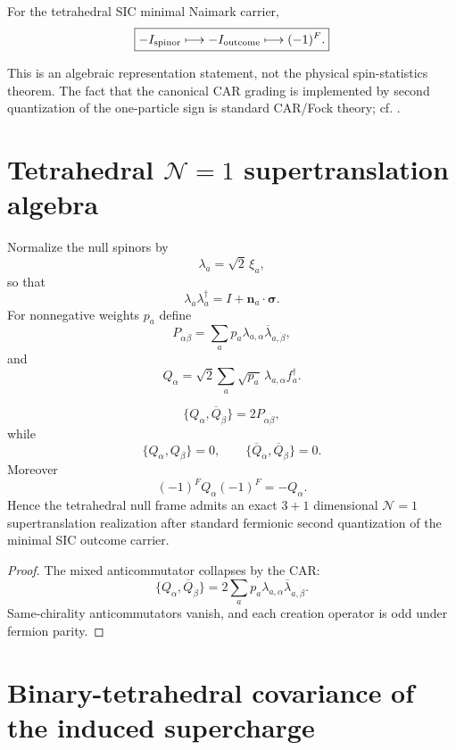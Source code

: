 \begin{theorem}\label{thm:center-parity}
For the tetrahedral SIC minimal Naimark carrier,
\[
\boxed{
-I_{\rm spinor}
\longmapsto
-I_{\rm outcome}
\longmapsto
(-1)^F.
}
\]
\end{theorem}

This is an algebraic representation statement, not the physical spin-statistics theorem. The fact that the canonical CAR grading is implemented by second quantization of the one-particle sign is standard CAR/Fock theory; cf. \cite{BratteliRobinson1997}.

\section{Tetrahedral $\mathcal N=1$ supertranslation algebra}

Normalize the null spinors by
\[
\lambda_a=\sqrt2\,\xi_a,
\]
so that
\[
\lambda_a\lambda_a^\dagger
=
I+\mathbf n_a\cdot\boldsymbol\sigma.
\]
For nonnegative weights $p_a$ define
\[
P_{\alpha\dot\beta}
=
\sum_a
p_a
\lambda_{a,\alpha}
\overline{\lambda}_{a,\dot\beta},
\]
and
\[
Q_\alpha
=
\sqrt2
\sum_a
\sqrt{p_a}\,
\lambda_{a,\alpha}f_a^\dagger.
\]

\begin{theorem}\label{thm:tetra-susy}
\[
\boxed{
\{Q_\alpha,\overline Q_{\dot\beta}\}
=
2P_{\alpha\dot\beta},
}
\]
while
\[
\{Q_\alpha,Q_\beta\}=0,
\qquad
\{\overline Q_{\dot\alpha},\overline Q_{\dot\beta}\}=0.
\]
Moreover
\[
\boxed{
(-1)^FQ_\alpha(-1)^F=-Q_\alpha.
}
\]
Hence the tetrahedral null frame admits an exact $3+1$ dimensional $\mathcal N=1$ supertranslation realization after standard fermionic second quantization of the minimal SIC outcome carrier.
\end{theorem}

\begin{proof}
The mixed anticommutator collapses by the CAR:
\[
\{Q_\alpha,\overline Q_{\dot\beta}\}
=
2
\sum_a
p_a
\lambda_{a,\alpha}
\overline{\lambda}_{a,\dot\beta}.
\]
Same-chirality anticommutators vanish, and each creation operator is odd under fermion parity.
\end{proof}

\section{Binary-tetrahedral covariance of the induced supercharge}

